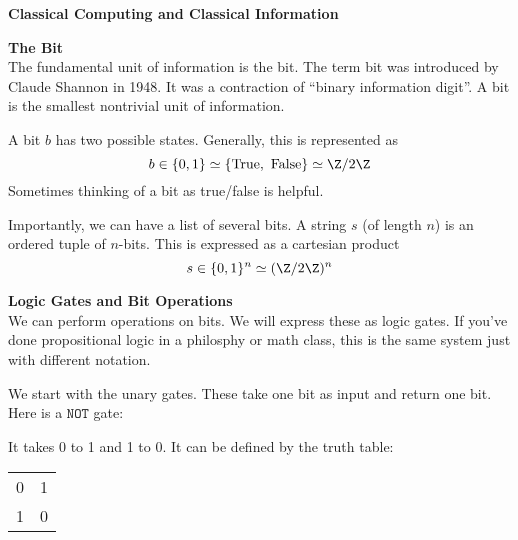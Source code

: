 \documentclass[11pt]{article}
\begin{document}




\begin{center}
\textbf{\Large Classical Computing and Classical Information} \\
\end{center}
\bigskip

\textbf{The Bit} \\
The fundamental unit of information is the bit. The term bit was introduced by Claude Shannon in 1948. It was a contraction of ``binary information digit''. A bit is the smallest nontrivial unit of information.

A bit $b$ has two possible states. Generally, this is represented as
\[
    b \in \{0, 1\} \simeq \{\text{True},\ \text{False}\} \simeq \Z/2\Z
\]
Sometimes thinking of a bit as true/false is helpful.

Importantly, we can have a list of several bits. A string $s$ (of length $n$) is an ordered tuple of $n$-bits. This is expressed as a cartesian product
\[
    s \in \{0, 1\}^n \simeq (\Z/2\Z)^n
\]

\pagebreak

\textbf{Logic Gates and Bit Operations} \\
We can perform operations on bits. We will express these as logic gates. If you've done propositional logic in a philosphy or math class, this is the same system just with different notation.

We start with the unary gates. These take one bit as input and return one bit. Here is a $\texttt{NOT}$ gate:
\begin{center}
    \hphantom{XXXX}
\end{center}

It takes 0 to 1 and 1 to 0. It can be defined by the truth table:
\begin{tabular}{l|l}
0 & 1 \\
1 & 0
\end{tabular}
\end{document}
